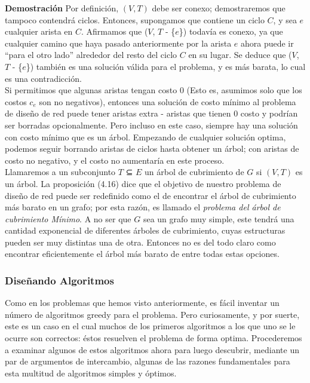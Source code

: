 \documentclass[a4paper, 12pt]{book}
\theoremstyle{dotless}
\begin{document}
\textbf{Demostración} Por definición, $(V,T)$ debe ser conexo; demostraremos que tampoco contendrá ciclos. Entonces, supongamos que contiene un ciclo $C$, y sea $e$ cualquier
arista en $C$. Afirmamos que ($V$, $T$ - \{$e$\}) todavía es conexo, ya que cualquier camino que haya pasado anteriormente por la arista $e$ ahora puede ir ``para el otro lado'' alrededor del resto
del ciclo $C$ en su lugar. Se deduce que ($V$, $T$ - \{$e$\}) también es una solución válida para el
problema, y es más barata, lo cual es una contradicción.\\

Si permitimos que algunas aristas tengan costo 0 (Esto es, asumimos solo que los costos $c_e$ son no negativos), entonces una solución de costo mínimo al problema de diseño de red puede tener aristas extra -  aristas que tienen 0 costo y podrían ser borradas opcionalmente. Pero incluso en este caso, siempre hay una solución con costo mínimo que es un árbol. Empezando de cualquier solución optima, podemos seguir borrando aristas de ciclos hasta obtener un árbol; con aristas de costo no negativo, y el costo no aumentaría en este proceso.\\
	
Llamaremos a un subconjunto $T$ ⊆ $E$ un árbol de cubrimiento de $G$ si $(V,T)$ es un árbol. La proposición (4.16) dice que el objetivo de nuestro problema de diseño de red puede ser redefinido como el de encontrar el árbol de cubrimiento más barato en un grafo; por esta razón, es llamado el \textit{problema del árbol de cubrimiento Mínimo}. A no ser que $G$ sea un grafo muy simple, este tendrá una cantidad exponencial de diferentes árboles de cubrimiento, cuyas estructuras pueden ser muy distintas una de otra. Entonces no es del todo claro como encontrar eficientemente el árbol más barato de entre todas estas opciones.\\
    
\subsubsection*{Diseñando Algoritmos}
Como en los problemas que hemos visto anteriormente, es fácil inventar un número de algoritmos greedy para el problema. Pero curiosamente, y por suerte, este es un caso en el cual muchos de los primeros algoritmos a los que uno se le ocurre son correctos: éstos resuelven el problema de forma optima. Procederemos a examinar algunos de estos algoritmos ahora para luego descubrir, mediante un par de argumentos de intercambio, algunas de las razones fundamentales para esta multitud de algoritmos simples y óptimos.\\
\end{document}
